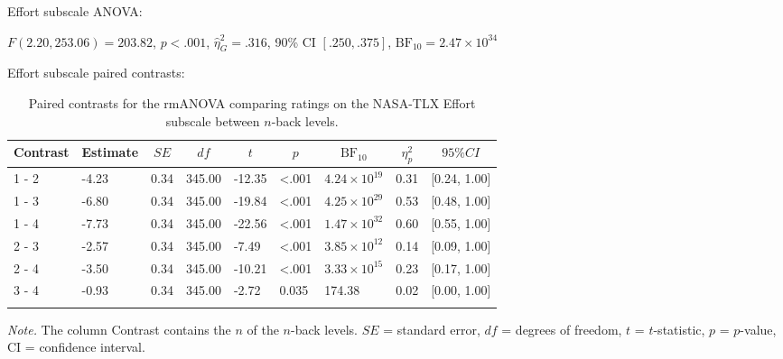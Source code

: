 \documentclass[
  man,floatsintext]{apa6}
\begin{document}
\newpage

Effort subscale ANOVA:

\(F(2.20, 253.06) = 203.82\), \(p < .001\), \(\hat{\eta}^2_G = .316\), 90\% CI \([.250, .375]\), \(\mathrm{BF}_{\textrm{10}} = 2.47 \times 10^{34}\)

Effort subscale paired contrasts:

\begin{table}[H]

\begin{center}
\begin{threeparttable}

\caption{\label{tab:unnamed-chunk-7}Paired contrasts for the rmANOVA comparing ratings on the NASA-TLX Effort subscale between $n$-back levels.}

\begin{tabular}{lllllllll}
\toprule
Contrast & \multicolumn{1}{c}{Estimate} & \multicolumn{1}{c}{$SE$} & \multicolumn{1}{c}{$df$} & \multicolumn{1}{c}{$t$} & \multicolumn{1}{c}{$p$} & \multicolumn{1}{c}{$\mathrm{BF}_{\textrm{10}}$} & \multicolumn{1}{c}{$\eta_{p}^{2}$} & \multicolumn{1}{c}{$95\% CI$}\\
\midrule
1 - 2 & -4.23 & 0.34 & 345.00 & -12.35 & <.001 & $4.24 \times 10^{19}$ & 0.31 & {}[0.24, 1.00]\\
1 - 3 & -6.80 & 0.34 & 345.00 & -19.84 & <.001 & $4.25 \times 10^{29}$ & 0.53 & {}[0.48, 1.00]\\
1 - 4 & -7.73 & 0.34 & 345.00 & -22.56 & <.001 & $1.47 \times 10^{32}$ & 0.60 & {}[0.55, 1.00]\\
2 - 3 & -2.57 & 0.34 & 345.00 & -7.49 & <.001 & $3.85 \times 10^{12}$ & 0.14 & {}[0.09, 1.00]\\
2 - 4 & -3.50 & 0.34 & 345.00 & -10.21 & <.001 & $3.33 \times 10^{15}$ & 0.23 & {}[0.17, 1.00]\\
3 - 4 & -0.93 & 0.34 & 345.00 & -2.72 & 0.035 & 174.38 & 0.02 & {}[0.00, 1.00]\\
\bottomrule
\addlinespace
\end{tabular}

\begin{tablenotes}[para]
\normalsize{\textit{Note.} The column Contrast contains the $n$ of the $n$-back levels. $SE$ = standard error, $df$ = degrees of freedom, $t$ = $t$-statistic, $p$ = $p$-value, CI = confidence interval.}
\end{tablenotes}

\end{threeparttable}
\end{center}

\end{table}
\end{document}
